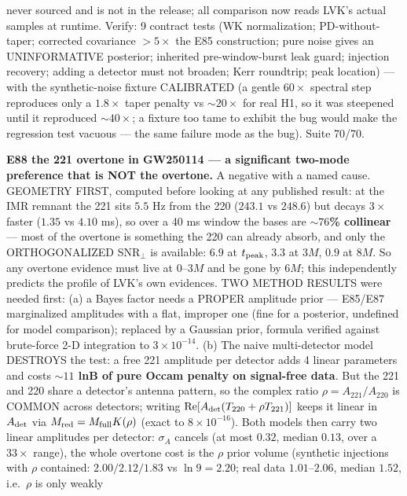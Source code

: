 \documentclass[10pt]{article}
\newcommand{\entry}[2]{\vspace{5pt}\noindent\textbf{#1}\quad #2\par}
\begin{document}
{never sourced and is not in the release; all comparison now reads LVK's actual samples at runtime. Verify:
9 contract tests (WK normalization; PD-without-taper; corrected covariance $>5\times$ the E85 construction;
pure noise gives an UNINFORMATIVE posterior; inherited pre-window-burst leak guard; injection recovery;
adding a detector must not broaden; Kerr roundtrip; peak location) --- with the synthetic-noise fixture
CALIBRATED (a gentle $60\times$ spectral step reproduces only a $1.8\times$ taper penalty vs ${\sim}20\times$
for real H1, so it was steepened until it reproduced ${\sim}40\times$; a fixture too tame to exhibit the bug
would make the regression test vacuous --- the same failure mode as the bug). Suite 70/70.}

\entry{E88 the 221 overtone in GW250114 --- a significant two-mode preference that is NOT the overtone.}{
A negative with a named cause. GEOMETRY FIRST, computed before looking at any published result: at the IMR
remnant the 221 sits $5.5$ Hz from the 220 ($243.1$ vs $248.6$) but decays $3\times$ faster ($1.35$ vs
$4.10$ ms), so over a 40 ms window the bases are \textbf{${\sim}76$\% collinear} --- most of the overtone is
something the 220 can already absorb, and only the ORTHOGONALIZED SNR$_\perp$ is available:
$6.9$ at $t_{\rm peak}$, $3.3$ at $3M$, $0.9$ at $8M$. So any overtone evidence must live at 0--3$M$ and be
gone by $6M$; this independently predicts the profile of LVK's own evidences. TWO METHOD RESULTS were
needed first: (a) a Bayes factor needs a PROPER amplitude prior --- E85/E87 marginalized amplitudes with a
flat, improper one (fine for a posterior, undefined for model comparison); replaced by a Gaussian prior,
formula verified against brute-force 2-D integration to $3\times10^{-14}$. (b) The naive multi-detector
model DESTROYS the test: a free 221 amplitude per detector adds 4 linear parameters and costs
\textbf{${\sim}11$ lnB of pure Occam penalty on signal-free data}. But the 221 and 220 share a detector's
antenna pattern, so the complex ratio $\rho=A_{221}/A_{220}$ is COMMON across detectors; writing
$\mathrm{Re}[A_{\rm det}(T_{220}+\rho T_{221})]$ keeps it linear in $A_{\rm det}$ via
$M_{\rm red}=M_{\rm full}K(\rho)$ (exact to $8\times10^{-16}$). Both models then carry two linear
amplitudes per detector: $\sigma_A$ cancels (at most $0.32$, median $0.13$, over a $33\times$ range), the
whole overtone cost is the $\rho$ prior volume (synthetic injections with $\rho$ contained:
$2.00/2.12/1.83$ vs $\ln 9=2.20$; real data $1.01$--$2.06$, median $1.52$, i.e.\ $\rho$ is only weakly
}
\end{document}
